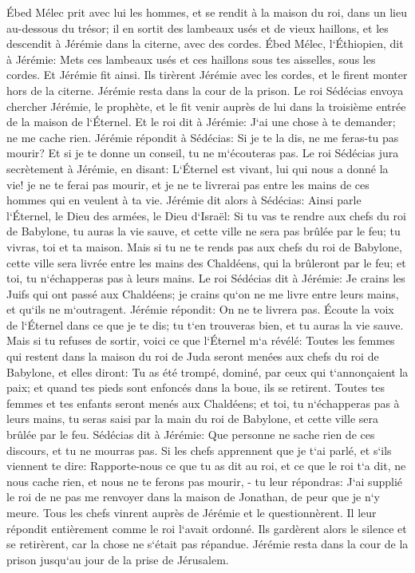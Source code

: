 \verse Ébed Mélec prit avec lui les hommes, et se rendit à la maison du roi, dans un lieu au-dessous du trésor; il en sortit des lambeaux usés et de vieux haillons, et les descendit à Jérémie dans la citerne, avec des cordes. 
\verse Ébed Mélec, l`Éthiopien, dit à Jérémie: Mets ces lambeaux usés et ces haillons sous tes aisselles, sous les cordes. Et Jérémie fit ainsi. 
\verse Ils tirèrent Jérémie avec les cordes, et le firent monter hors de la citerne. Jérémie resta dans la cour de la prison. 
\verse Le roi Sédécias envoya chercher Jérémie, le prophète, et le fit venir auprès de lui dans la troisième entrée de la maison de l`Éternel. Et le roi dit à Jérémie: J`ai une chose à te demander; ne me cache rien. 
\verse Jérémie répondit à Sédécias: Si je te la dis, ne me feras-tu pas mourir? Et si je te donne un conseil, tu ne m`écouteras pas. 
\verse Le roi Sédécias jura secrètement à Jérémie, en disant: L`Éternel est vivant, lui qui nous a donné la vie! je ne te ferai pas mourir, et je ne te livrerai pas entre les mains de ces hommes qui en veulent à ta vie. 
\verse Jérémie dit alors à Sédécias: Ainsi parle l`Éternel, le Dieu des armées, le Dieu d`Israël: Si tu vas te rendre aux chefs du roi de Babylone, tu auras la vie sauve, et cette ville ne sera pas brûlée par le feu; tu vivras, toi et ta maison. 
\verse Mais si tu ne te rends pas aux chefs du roi de Babylone, cette ville sera livrée entre les mains des Chaldéens, qui la brûleront par le feu; et toi, tu n`échapperas pas à leurs mains. 
\verse Le roi Sédécias dit à Jérémie: Je crains les Juifs qui ont passé aux Chaldéens; je crains qu`on ne me livre entre leurs mains, et qu`ils ne m`outragent. 
\verse Jérémie répondit: On ne te livrera pas. Écoute la voix de l`Éternel dans ce que je te dis; tu t`en trouveras bien, et tu auras la vie sauve. 
\verse Mais si tu refuses de sortir, voici ce que l`Éternel m`a révélé: 
\verse Toutes les femmes qui restent dans la maison du roi de Juda seront menées aux chefs du roi de Babylone, et elles diront: Tu as été trompé, dominé, par ceux qui t`annonçaient la paix; et quand tes pieds sont enfoncés dans la boue, ils se retirent. 
\verse Toutes tes femmes et tes enfants seront menés aux Chaldéens; et toi, tu n`échapperas pas à leurs mains, tu seras saisi par la main du roi de Babylone, et cette ville sera brûlée par le feu. 
\verse Sédécias dit à Jérémie: Que personne ne sache rien de ces discours, et tu ne mourras pas. 
\verse Si les chefs apprennent que je t`ai parlé, et s`ils viennent te dire: Rapporte-nous ce que tu as dit au roi, et ce que le roi t`a dit, ne nous cache rien, et nous ne te ferons pas mourir, - 
\verse tu leur répondras: J`ai supplié le roi de ne pas me renvoyer dans la maison de Jonathan, de peur que je n`y meure. 
\verse Tous les chefs vinrent auprès de Jérémie et le questionnèrent. Il leur répondit entièrement comme le roi l`avait ordonné. Ils gardèrent alors le silence et se retirèrent, car la chose ne s`était pas répandue. 
\verse Jérémie resta dans la cour de la prison jusqu`au jour de la prise de Jérusalem. 

